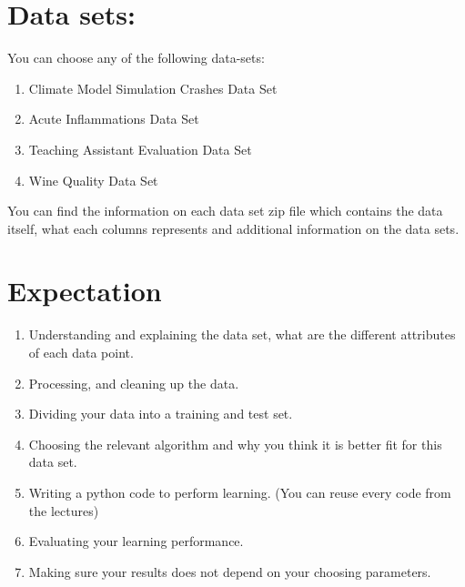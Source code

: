 \documentclass[12pt,letterpaper]{article}
\begin{document}
\section*{Data sets:}
You can choose any of the following data-sets:

\begin{enumerate}
\item Climate Model Simulation Crashes Data Set 

\item Acute Inflammations Data Set 

\item Teaching Assistant Evaluation Data Set 


\item Wine Quality Data Set 
\end{enumerate}

You can find the information on each data set zip file which contains the data itself, what each columns represents and additional information on the data sets.

\section*{Expectation}
\begin{enumerate}
\item Understanding and explaining the data set, what are the different attributes of each data point.

\item Processing, and cleaning up the data. 

\item Dividing your data into a training and test set. 

\item Choosing the relevant algorithm and why you think it is better fit for this data set.

\item Writing a python code to perform learning. (You can reuse every code from the lectures)

\item Evaluating your learning performance. 

\item Making sure your results does not depend on your choosing parameters.
\end{enumerate}
\end{document}
